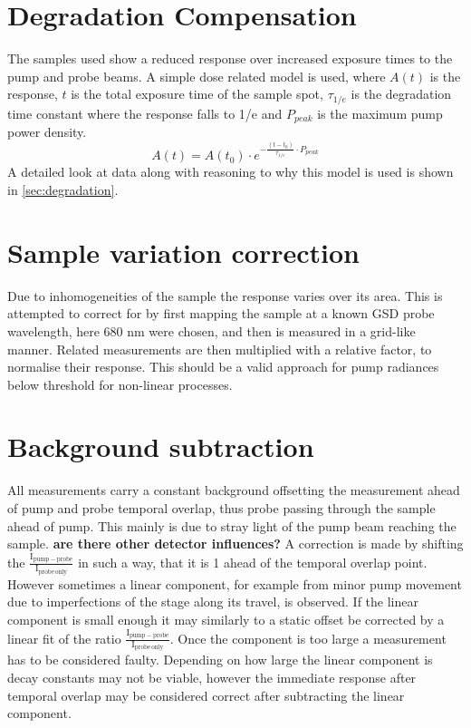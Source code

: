 \documentclass[twoside,openright]{scrreprt}
\begin{document}
\section{Degradation Compensation}
The samples used show a reduced response over increased exposure times to the pump and probe beams. A simple dose related model is used, where $A(t)$ is the response, $t$ is the total exposure time of the sample spot, $\tau_{1/e}$ is the degradation time constant where the response falls to 1/e and $P_{peak}$ is the maximum pump power density.
\begin{equation}
A(t) = A(t_0)\cdot e^{-\frac{(t-t_0)}{\tau_{1/e}}\cdot P_{peak}}
\end{equation}
A detailed look at data along with reasoning to why this model is used is shown in \ref{sec:degradation}.

\section{Sample variation correction}
Due to inhomogeneities of the sample the response varies over its area. This is attempted to correct for by first mapping the sample at a known GSD probe wavelength, here 680 nm were chosen, and then is measured in a grid-like manner. Related measurements are then multiplied with a relative factor, to normalise their response. This should be a valid approach for pump radiances below threshold for  non-linear processes.

\section{Background subtraction}
All measurements carry a constant background offsetting the measurement ahead of pump and probe temporal overlap, thus probe passing through the sample ahead of pump. This mainly is due to stray light of the pump beam reaching the sample. \textbf{are there other detector influences?} A correction is made by shifting the $\mathrm{\frac{I_{pump-probe}}{I_{probe\, only}}}$ in such a way, that it is 1 ahead of the temporal overlap point. \\
However sometimes a linear component, for example from minor pump movement due to imperfections of the stage along its travel, is observed. If the linear component is small enough it may similarly to a static offset be corrected by a linear fit of the ratio $\mathrm{\frac{I_{pump-probe}}{I_{probe\, only}}}$. Once the component is too large a measurement has to be considered faulty. Depending on how large the linear component is decay constants may not be viable, however the immediate response after temporal overlap may be considered correct after subtracting the linear component.\\
\end{document}

